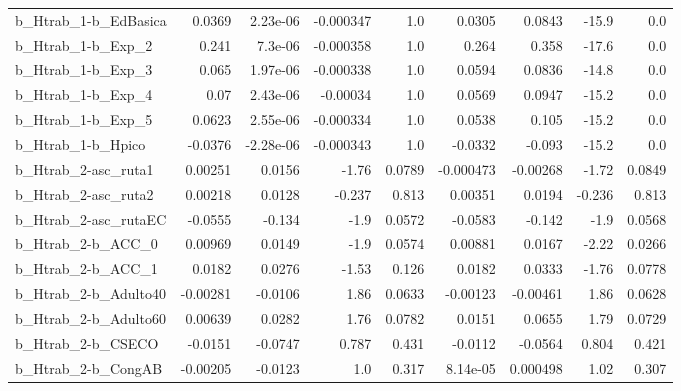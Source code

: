 \begin{tabular}{lrrrrrrrr}
b\_Htrab\_1-b\_EdBasica       &      0.0369 &     2.23e-06 & -0.000347 &      1.0 &     0.0305 &      0.0843 &        -15.9 &           0.0 \\
b\_Htrab\_1-b\_Exp\_2          &       0.241 &      7.3e-06 & -0.000358 &      1.0 &      0.264 &       0.358 &        -17.6 &           0.0 \\
b\_Htrab\_1-b\_Exp\_3          &       0.065 &     1.97e-06 & -0.000338 &      1.0 &     0.0594 &      0.0836 &        -14.8 &           0.0 \\
b\_Htrab\_1-b\_Exp\_4          &        0.07 &     2.43e-06 &  -0.00034 &      1.0 &     0.0569 &      0.0947 &        -15.2 &           0.0 \\
b\_Htrab\_1-b\_Exp\_5          &      0.0623 &     2.55e-06 & -0.000334 &      1.0 &     0.0538 &       0.105 &        -15.2 &           0.0 \\
b\_Htrab\_1-b\_Hpico          &     -0.0376 &    -2.28e-06 & -0.000343 &      1.0 &    -0.0332 &      -0.093 &        -15.2 &           0.0 \\
b\_Htrab\_2-asc\_ruta1        &     0.00251 &       0.0156 &     -1.76 &   0.0789 &  -0.000473 &    -0.00268 &        -1.72 &        0.0849 \\
b\_Htrab\_2-asc\_ruta2        &     0.00218 &       0.0128 &    -0.237 &    0.813 &    0.00351 &      0.0194 &       -0.236 &         0.813 \\
b\_Htrab\_2-asc\_rutaEC       &     -0.0555 &       -0.134 &      -1.9 &   0.0572 &    -0.0583 &      -0.142 &         -1.9 &        0.0568 \\
b\_Htrab\_2-b\_ACC\_0          &     0.00969 &       0.0149 &      -1.9 &   0.0574 &    0.00881 &      0.0167 &        -2.22 &        0.0266 \\
b\_Htrab\_2-b\_ACC\_1          &      0.0182 &       0.0276 &     -1.53 &    0.126 &     0.0182 &      0.0333 &        -1.76 &        0.0778 \\
b\_Htrab\_2-b\_Adulto40       &    -0.00281 &      -0.0106 &      1.86 &   0.0633 &   -0.00123 &    -0.00461 &         1.86 &        0.0628 \\
b\_Htrab\_2-b\_Adulto60       &     0.00639 &       0.0282 &      1.76 &   0.0782 &     0.0151 &      0.0655 &         1.79 &        0.0729 \\
b\_Htrab\_2-b\_CSECO          &     -0.0151 &      -0.0747 &     0.787 &    0.431 &    -0.0112 &     -0.0564 &        0.804 &         0.421 \\
b\_Htrab\_2-b\_CongAB         &    -0.00205 &      -0.0123 &       1.0 &    0.317 &   8.14e-05 &    0.000498 &         1.02 &         0.307 \\

\end{tabular}
